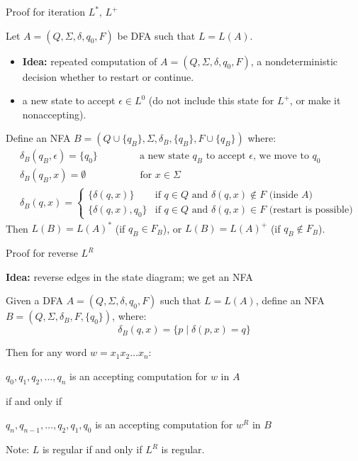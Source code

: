 \documentclass[handout]{beamer}
\begin{document}
\begin{frame}{Proof for iteration $L^*$, $L^+$}

    Let $A=(Q,\Sigma, \delta,q_0,F)$ be DFA such that $L=L(A)$. 
    \begin{itemize}
        \item \textbf{Idea:} repeated computation of $A=(Q,\Sigma, \delta,q_0,F)$, a nondeterministic decision whether to restart or continue.
        \item a new state to accept $\epsilon\in L^0$ (do not include this state for $L^+$, or make it nonaccepting).
    \end{itemize}
       
    Define an NFA $B=(Q\cup \{q_B\},\Sigma,\delta_B,\{q_B\},F\cup \{q_B\})$ where:
    \begin{align*}
        &\delta_B(q_B,\epsilon)=\{q_0\}\qquad\qquad\ \text{a new state $q_B$ to accept $\epsilon$, we move to $q_0$}\\
        &\delta_B(q_B,x)=\emptyset\quad\qquad\qquad\ \ \text{for $x\in \Sigma$}\\
        &\delta_B(q,x)=
        \begin{cases}
        \{\delta(q,x)\} & \text{if $q\in Q$ and $\delta(q,x)\notin F$ (inside $A$)}\\
        \{\delta(q,x),q_0\} & \text{if $q\in Q$ and $\delta(q,x)\in F$ (restart is possible)}
        \end{cases}
    \end{align*}
    Then $L(B)=L(A)^*$ (if $q_B\in F_B$), or $L(B)=L(A)^+$ (if $q_B\notin F_B$).
    
    \hfill\qedsymbol

\end{frame}
    

\begin{frame}{Proof for reverse $L^R$}

    \textbf{Idea:} reverse edges in the state diagram; we get an NFA

    Given a DFA  $A=(Q,\Sigma, \delta,q_0,F)$ such that $L=L(A)$, define an NFA $B=(Q,\Sigma,\delta_B,F,\{q_0\})$, where:
    $$
        \delta_B(q,x)=\{p\mid \delta(p,x)=q\}
    $$

    Then for any word $w=x_1x_2\ldots x_n$:
    
    \begin{center}
        $q_0,q_1,q_2,\ldots, q_n$ is an accepting computation for $w$ in $A$   

        if and only if

        $q_n,q_{n-1},\ldots,q_2,q_1,q_0$ is an accepting computation for $w^R$ in $B$
    \end{center}
    \hfill\qedsymbol

    Note: $L$ is regular \alert{if and only if} $L^R$ is regular.

\end{frame}
\end{document}
